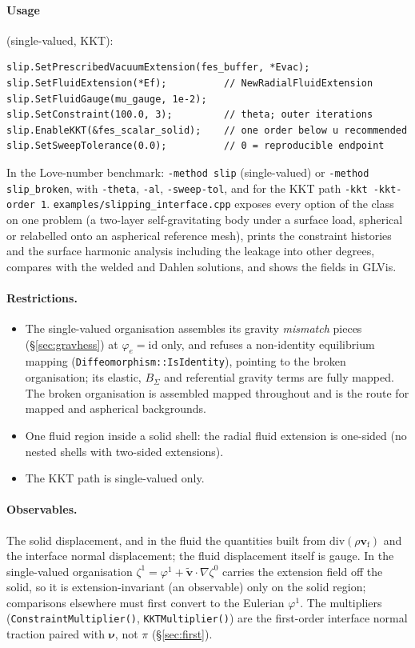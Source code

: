 \documentclass[11pt]{article}
\newcommand{\bnu}{\bm{\nu}}
\newcommand{\bv}{\mathbf{v}}
\begin{document}
\paragraph{Usage} (single-valued, KKT):
\begin{verbatim}
slip.SetPrescribedVacuumExtension(fes_buffer, *Evac);
slip.SetFluidExtension(*Ef);          // NewRadialFluidExtension
slip.SetFluidGauge(mu_gauge, 1e-2);
slip.SetConstraint(100.0, 3);         // theta; outer iterations
slip.EnableKKT(&fes_scalar_solid);    // one order below u recommended
slip.SetSweepTolerance(0.0);          // 0 = reproducible endpoint
\end{verbatim}
In the Love-number benchmark: \texttt{-method slip} (single-valued) or
\texttt{-method slip\_broken}, with \texttt{-theta}, \texttt{-al},
\texttt{-sweep-tol}, and for the KKT path \texttt{-kkt -kkt-order 1}.
\texttt{examples/slipping\_interface.cpp} exposes every option of the
class on one problem (a two-layer self-gravitating body under a surface
load, spherical or relabelled onto an aspherical reference mesh), prints
the constraint histories and the surface harmonic analysis including the
leakage into other degrees, compares with the welded and Dahlen
solutions, and shows the fields in GLVis.

\paragraph{Restrictions.}
\begin{itemize}
\item The single-valued organisation assembles its gravity
  \emph{mismatch} pieces (\S\ref{sec:gravhess}) at
  $\varphi_e = \mathrm{id}$ only, and refuses a non-identity equilibrium
  mapping (\texttt{Diffeomorphism::IsIdentity}), pointing to the broken
  organisation; its elastic, $B_\Sigma$ and referential gravity terms are
  fully mapped. The broken organisation is assembled mapped throughout
  and is the route for mapped and aspherical backgrounds.
\item One fluid region inside a solid shell: the radial fluid extension
  is one-sided (no nested shells with two-sided extensions).
\item The KKT path is single-valued only.
\end{itemize}

\paragraph{Observables.} The solid displacement, and in the fluid the
quantities built from $\mathrm{div}(\rho\bv_{\mathrm{f}})$ and the
interface normal displacement; the fluid displacement itself is gauge.
In the single-valued organisation $\zeta^1 = \varphi^1 +
\tilde{\bv}\cdot\nabla\zeta^0$ carries the extension field off the
solid, so it is extension-invariant (an observable) only on the solid
region; comparisons elsewhere must first convert to the Eulerian
$\varphi^1$. The multipliers (\texttt{ConstraintMultiplier()},
\texttt{KKTMultiplier()}) are the first-order interface normal traction
paired with $\bnu$, not $\pi$ (\S\ref{sec:first}).
\end{document}
